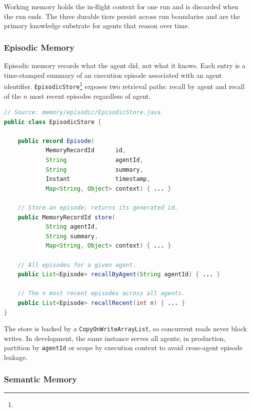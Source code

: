 Working memory holds the in-flight context for one run and is discarded
when the run ends.  The three durable tiers persist across run boundaries
and are the primary knowledge substrate for agents that reason over time.

\subsubsection*{Episodic Memory}

Episodic memory records what the agent did, not what it knows.  Each entry
is a time-stamped summary of an execution episode associated with an agent
identifier.  \texttt{EpisodicStore}\footnote{}
exposes two retrieval paths: recall by agent and recall of the $n$ most
recent episodes regardless of agent.

\begin{lstlisting}[language=Java,
  caption={\texttt{EpisodicStore} --- thread-safe episode storage
           (\texttt{memory/episodic/EpisodicStore.java})},
  label={lst:episodic-store}]
// Source: memory/episodic/EpisodicStore.java
public class EpisodicStore {

    public record Episode(
            MemoryRecordId      id,
            String              agentId,
            String              summary,
            Instant             timestamp,
            Map<String, Object> context) { ... }

    // Store an episode; returns its generated id.
    public MemoryRecordId store(
            String agentId,
            String summary,
            Map<String, Object> context) { ... }

    // All episodes for a given agent.
    public List<Episode> recallByAgent(String agentId) { ... }

    // The n most recent episodes across all agents.
    public List<Episode> recallRecent(int n) { ... }
}
\end{lstlisting}

The store is backed by a \texttt{CopyOnWriteArrayList}, so concurrent
reads never block writes.  In development, the same instance serves all
agents; in production, partition by \texttt{agentId} or scope by
execution context to avoid cross-agent episode leakage.

\subsubsection*{Semantic Memory}

